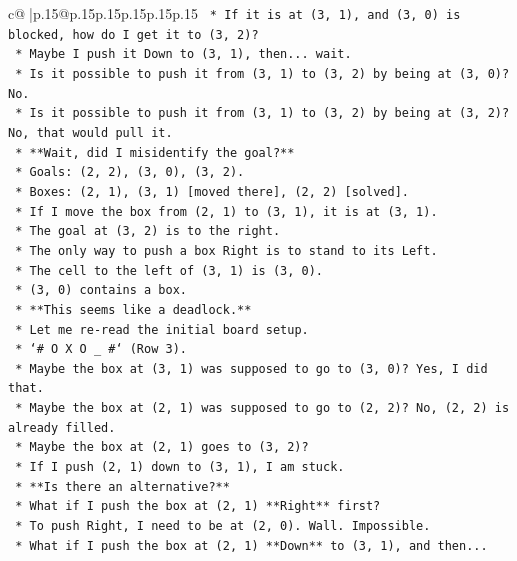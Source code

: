 \documentclass{article}
\begin{document}
{\begin{supertabular}{c@{$\;$}|p{.15\linewidth}@{}p{.15\linewidth}p{.15\linewidth}p{.15\linewidth}p{.15\linewidth}p{.15\linewidth}}
{{{\texttt{        *   If it is at (3, 1), and (3, 0) is blocked, how do I get it to (3, 2)?} \\
\texttt{        *   Maybe I push it Down to (3, 1), then... wait.} \\
\texttt{        *   Is it possible to push it from (3, 1) to (3, 2) by being at (3, 0)? No.} \\
\texttt{        *   Is it possible to push it from (3, 1) to (3, 2) by being at (3, 2)? No, that would pull it.} \\
\texttt{        *   **Wait, did I misidentify the goal?**} \\
\texttt{        *   Goals: (2, 2), (3, 0), (3, 2).} \\
\texttt{        *   Boxes: (2, 1), (3, 1) {[}moved there{]}, (2, 2) {[}solved{]}.} \\
\texttt{        *   If I move the box from (2, 1) to (3, 1), it is at (3, 1).} \\
\texttt{        *   The goal at (3, 2) is to the right.} \\
\texttt{        *   The only way to push a box Right is to stand to its Left.} \\
\texttt{        *   The cell to the left of (3, 1) is (3, 0).} \\
\texttt{        *   (3, 0) contains a box.} \\
\texttt{        *   **This seems like a deadlock.**} \\
\texttt{        *   Let me re{-}read the initial board setup.} \\
\texttt{        *   `\# O X O \_ \#` (Row 3).} \\
\texttt{        *   Maybe the box at (3, 1) was supposed to go to (3, 0)? Yes, I did that.} \\
\texttt{        *   Maybe the box at (2, 1) was supposed to go to (2, 2)? No, (2, 2) is already filled.} \\
\texttt{        *   Maybe the box at (2, 1) goes to (3, 2)?} \\
\texttt{        *   If I push (2, 1) down to (3, 1), I am stuck.} \\
\texttt{        *   **Is there an alternative?**} \\
\texttt{        *   What if I push the box at (2, 1) **Right** first?} \\
\texttt{        *   To push Right, I need to be at (2, 0). Wall. Impossible.} \\
\texttt{        *   What if I push the box at (2, 1) **Down** to (3, 1), and then...} \\
}}}
\end{supertabular}}
\end{document}
